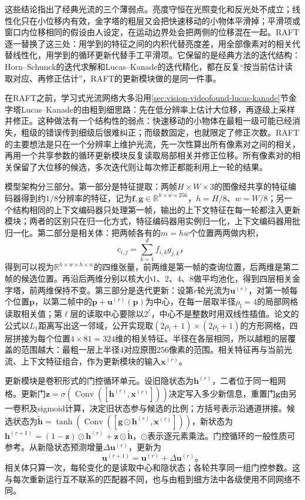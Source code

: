 这些结论指出了经典光流的三个薄弱点。亮度守恒在光照变化和反光处不成立；线性化只在小位移内有效，金字塔的粗层又会把快速移动的小物体平滑掉；平滑项或窗口内位移相同的假设由人设定，在运动边界处会把两侧的位移混在一起。RAFT逐一替换了这三处：用学到的特征之间的内积代替亮度差，用全部像素对的相关代替线性化，用学到的循环更新代替手工平滑项。它保留的是经典方法的迭代结构：Horn--Schunck的迭代求解和Lucas--Kanade的迭代精化，都在反复“按当前估计读取对应、再修正估计”，RAFT的更新模块做的是同一件事。

在RAFT之前，学习式光流网络大多沿用\ref{sec:vision-videofound-lucas-kanade}节金字塔Lucas--Kanade的由粗到细思路：先在低分辨率上估计大位移，再逐级上采样并修正。这种做法有一个结构性的弱点：快速移动的小物体在最粗一级可能已经消失，粗级的错误传到细级后很难纠正；而级数固定，也就限定了修正次数。RAFT的主要想法是只在一个分辨率上维护光流，先一次性算出所有像素对之间的相关，再用一个共享参数的循环更新模块反复读取局部相关并修正位移。所有像素对的相关保留了大位移的候选，多次迭代则让每次修正都能利用上一轮的结果。

模型架构分三部分。第一部分是特征提取：两帧$H\times W\times3$的图像经共享的特征编码器得到约$1/8$分辨率的特征，记为$\bm{f},\bm{g}\in\mathbb{R}^{h\times w\times 256}$，$h=H/8$、$w=W/8$；另一个结构相同的上下文编码器只处理第一帧，输出的上下文特征在每一轮都注入更新模块；两者的区别只在归一化方式，特征编码器用实例归一化，上下文编码器用批归一化。第二部分是相关体：把两帧各有的$m=hw$个位置两两做内积，
\begin{equation}
  c_{i,j}=\sum_{k=1}^{d}f_{i,k}g_{j,k}\text{，}
  \label{eq:vision-video-all-pairs}
\end{equation}
得到可以视为$\mathbb{R}^{h\times w\times h\times w}$的四维张量，前两维是第一帧的查询位置，后两维是第二帧的候选位置。再沿后两维分别以核大小1、2、4、8做平均池化，得到四层相关金字塔，前两维保持不变。第三部分是迭代更新：设第$r$轮光流为$\bm{u}^{(r)}$，对第一帧每个位置$\bm{p}$，以第二帧中的$\bm{p}+\bm{u}^{(r)}(\bm{p})$为中心，在每一层取半径$\rho_{\mathrm{l}}=4$的局部网格读取相关值；第$\ell$层的读取中心要除以$2^\ell$，中心不是整数时用双线性插值。论文的公式以$L_1$距离写出这一邻域，公开实现取$(2\rho_{\mathrm{l}}+1)\times(2\rho_{\mathrm{l}}+1)$的方形网格，四层拼接为每个位置$4\times81=324$维的相关特征。半径在各层相同，所以越粗的层覆盖的范围越大：最粗一层上半径4对应原图256像素的范围。相关特征再与当前光流、上下文特征组合，作为更新模块的输入$\bm{x}^{(r)}$。

更新模块是卷积形式的门控循环单元。设旧隐状态为$\bm{h}^{(r)}$，二者位于同一粗网格。更新门$\bm{z}=\sigma(\operatorname{Conv}([\bm{h}^{(r)},\bm{x}^{(r)}]))$决定写入多少新信息，重置门$\bm{g}$由另一卷积及sigmoid计算，决定旧状态参与候选的比例；方括号表示沿通道拼接。候选状态为$\widetilde{\bm{h}}=\tanh(\operatorname{Conv}([\bm{g}\odot\bm{h}^{(r)},\bm{x}^{(r)}]))$，新状态为$\bm{h}^{(r+1)}=(1-\bm{z})\odot\bm{h}^{(r)}+\bm{z}\odot\widetilde{\bm{h}}$，$\odot$表示逐元素乘法。门控循环的一般性质可参考。从新隐状态预测增量$\Delta\bm{u}^{(r)}$，更新为
\[
  \bm{u}^{(r+1)}=\bm{u}^{(r)}+\Delta\bm{u}^{(r)}\text{。}
\]
相关体只算一次，每轮变化的是读取中心和隐状态；各轮共享同一组门控参数。这与每次重新运行互不联系的匹配器不同，也与由粗到细方法中各级使用不同网络不同。

